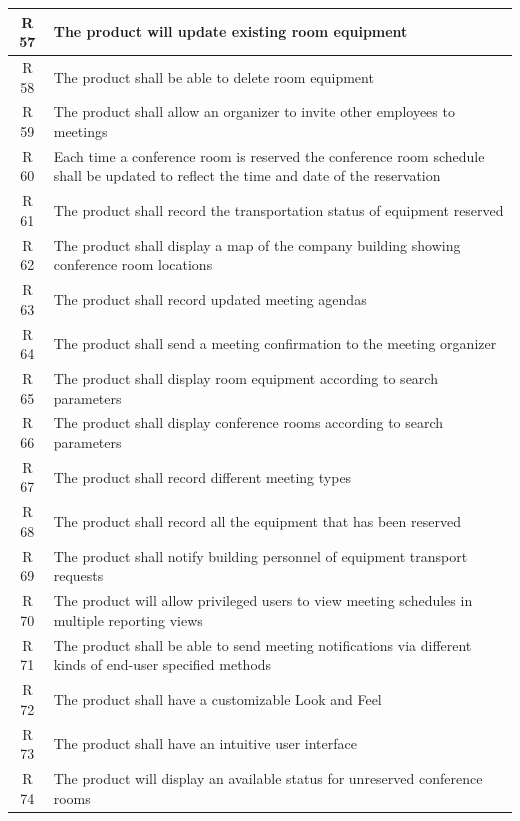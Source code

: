 \documentclass[dissertation,final]{softeng}
\begin{document}
\begin{appendices}
{\begin{center}
\begin{longtable}{c m{}}
    R 57  & The product will update existing room equipment \\ \midrule
    R 58  & The product shall be able to delete room equipment \\ \midrule
    R 59  & The product shall allow an organizer to invite other employees to meetings \\ \midrule
    R 60  & Each time a conference room is reserved the conference room schedule shall be updated to reflect the time and date of the reservation \\ \midrule
    R 61  & The product shall record the transportation status of equipment reserved \\ \midrule
    R 62  & The product shall display a map of the company building showing conference room locations \\ \midrule
    R 63  & The product shall record updated meeting agendas \\ \midrule
    R 64  & The product shall send a meeting confirmation to the meeting organizer \\* \midrule
    R 65  & The product shall display room equipment according to search parameters \\ \midrule
    R 66  & The product shall display conference rooms according to search parameters \\ \midrule
    R 67  & The product shall record different meeting types \\ \midrule
    R 68  & The product shall record all the equipment that has been reserved \\ \midrule
    R 69  & The product shall notify building personnel of equipment transport requests \\ \midrule
    R 70  & The product will allow privileged users to view meeting schedules in multiple reporting views \\ \midrule
    R 71  & The product shall be able to send meeting notifications via different kinds of end-user specified methods \\ \midrule
    R 72  & The product shall have a customizable Look and Feel \\ \midrule
    R 73  & The product shall have an intuitive user interface \\ \midrule
    R 74  & The product will display an available status for unreserved conference rooms \\
\end{longtable}
\end{center}
}


\end{appendices}
\end{document}
